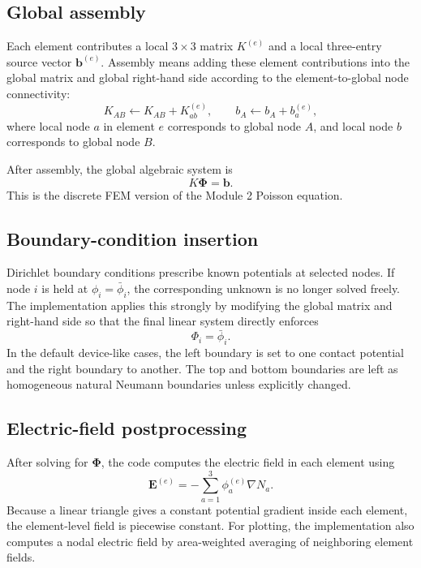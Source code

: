\documentclass[11pt]{article}
\newcommand{\Evec}{\mathbf{E}}
\begin{document}
\subsection{Global assembly}

Each element contributes a local $3\times 3$ matrix $K^{(e)}$ and a local three-entry source vector $\bm{b}^{(e)}$. Assembly means adding these element contributions into the global matrix and global right-hand side according to the element-to-global node connectivity:
\begin{equation}
K_{AB} \leftarrow K_{AB} + K_{ab}^{(e)},
\qquad
b_A \leftarrow b_A + b_a^{(e)},
\end{equation}
where local node $a$ in element $e$ corresponds to global node $A$, and local node $b$ corresponds to global node $B$.

After assembly, the global algebraic system is
\begin{equation}
\boxed{K \bm{\Phi} = \bm{b}.}
\end{equation}
This is the discrete FEM version of the Module 2 Poisson equation.

\subsection{Boundary-condition insertion}

Dirichlet boundary conditions prescribe known potentials at selected nodes. If node $i$ is held at $\phi_i=\bar{\phi}_i$, the corresponding unknown is no longer solved freely. The implementation applies this strongly by modifying the global matrix and right-hand side so that the final linear system directly enforces
\begin{equation}
\Phi_i = \bar{\phi}_i.
\end{equation}
In the default device-like cases, the left boundary is set to one contact potential and the right boundary to another. The top and bottom boundaries are left as homogeneous natural Neumann boundaries unless explicitly changed.

\subsection{Electric-field postprocessing}

After solving for $\bm{\Phi}$, the code computes the electric field in each element using
\begin{equation}
\Evec^{(e)} = -\sum_{a=1}^{3} \phi_a^{(e)} \nabla N_a.
\end{equation}
Because a linear triangle gives a constant potential gradient inside each element, the element-level field is piecewise constant. For plotting, the implementation also computes a nodal electric field by area-weighted averaging of neighboring element fields.
\end{document}
